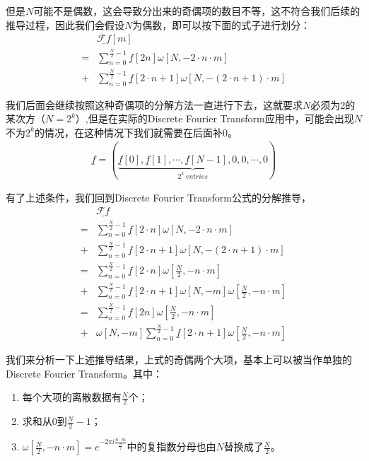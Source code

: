 但是$N$可能不是偶数，这会导致分出来的奇偶项的数目不等，这不符合我们后续的推导过程，因此我们会假设$N$为偶数，即可以按下面的式子进行划分：
\begin{align*}
	  & \underline{\mathcal{F}f}[m]                                                       \\
	= & \sum_{n=0}^{\frac{N}{2}-1}\underline{f}[2n]\omega[N,-2\cdot n\cdot m]             \\
	+ & \sum_{n=0}^{\frac{N}{2}-1}\underline{f}[2\cdot n+1]\omega[N,-(2\cdot n+1)\cdot m]
\end{align*}

我们后面会继续按照这种奇偶项的分解方法一直进行下去，这就要求$N$必须为2的某次方（$N=2^k$）,但是在实际的Discrete Fourier Transform应用中，可能会出现$N$不为$2^k$的情况，在这种情况下我们就需要在后面补$0$。
\begin{align*}
	\underline{f} = (\underbrace{ \underline{f}[0],\underline{f}[1],\cdots,\underline{f}[N-1],0,0,\cdots,0 }_{2^k\ entries} )
\end{align*}

有了上述条件，我们回到Discrete Fourier Transform公式的分解推导，
\begin{align*}
	  & \underline{\mathcal{F}f}                                                                     \\
	= & \sum_{n=0}^{\frac{N}{2}-1}\underline{f}[2\cdot n]\omega[N,-2\cdot n\cdot m]                  \\
	+ & \sum_{n=0}^{\frac{N}{2}-1}\underline{f}[2\cdot n+1]\omega[N,-(2\cdot n+1)\cdot m]            \\
	= & \sum_{n=0}^{\frac{N}{2}-1}\underline{f}[2\cdot n]\omega[\frac{N}{2},-n\cdot m]               \\
	+ & \sum_{n=0}^{\frac{N}{2}-1}\underline{f}[2\cdot n+1]\omega[N,-m]\omega[\frac{N}{2},-n\cdot m] \\
	= & \sum_{n=0}^{\frac{N}{2}-1}\underline{f}[2n]\omega[\frac{N}{2},-n\cdot m]                     \\
	+ & \omega[N,-m]\sum_{n=0}^{\frac{N}{2}-1}\underline{f}[2\cdot n+1]\omega[\frac{N}{2},-n\cdot m]
\end{align*}

我们来分析一下上述推导结果，上式的奇偶两个大项，基本上可以被当作单独的Discrete Fourier Transform。其中：
\begin{enumerate}
	\item 每个大项的离散数据有$\frac{N}{2}$个；
	\item 求和从$0$到$\frac{N}{2}-1$；
	\item $\omega[\frac{N}{2},-n\cdot m] = e^{-2\pi i\frac{n\cdot m}{\frac{N}{2}}}$中的复指数分母也由$N$替换成了$\frac{N}{2}$。
\end{enumerate}

